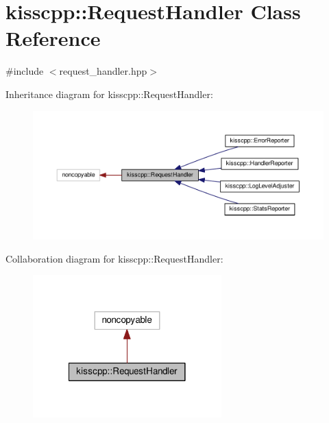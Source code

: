 \hypertarget{classkisscpp_1_1_request_handler}{\section{kisscpp\-:\-:Request\-Handler Class Reference}
\label{classkisscpp_1_1_request_handler}
}


{\ttfamily \#include $<$request\-\_\-handler.\-hpp$>$}



Inheritance diagram for kisscpp\-:\-:Request\-Handler\-:\nopagebreak
\begin{figure}[H]
\begin{center}
\leavevmode
\includegraphics[width=350pt]{classkisscpp_1_1_request_handler__inherit__graph}
\end{center}
\end{figure}


Collaboration diagram for kisscpp\-:\-:Request\-Handler\-:\nopagebreak
\begin{figure}[H]
\begin{center}
\leavevmode
\includegraphics[width=206pt]{classkisscpp_1_1_request_handler__coll__graph}
\end{center}
\end{figure}
